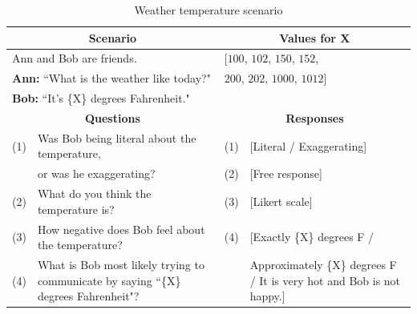 \documentclass{article} %
\begin{document}
\begin{table}[h]
\begin{tabular}{| p{0.15cm}  p{8.15cm}| p{0.15cm}p{4cm} |}\hline
\multicolumn{2}{|c|}{\textbf{Scenario}} & \multicolumn{2}{c|}{\textbf{Values for X}} \\\hline
\multicolumn{2}{|l|}{Ann and Bob are friends.} & \multicolumn{2}{l|}{[$100$, $102$, $150$, $152$,}\\
\multicolumn{2}{|l|}{\textbf{Ann:} ``What is the weather like today?"} & \multicolumn{2}{l|}{$200$, $202$, $1000$, $1012$]}\\
\multicolumn{2}{|l|}{\textbf{Bob:} ``It's \{X\} degrees Fahrenheit."} & \multicolumn{2}{l|}{}\\\hline
\multicolumn{2}{|c|}{\textbf{Questions}} & \multicolumn{2}{c|}{\textbf{Responses}} \\\hline
(1) & Was Bob being literal about the temperature, & (1) &[Literal / Exaggerating] \\
 & or was he exaggerating? & (2) & [Free response] \\
(2) & What do you think the temperature is? & (3) & [Likert scale] \\
(3) & How negative does Bob feel about the temperature? & (4) & [Exactly \{X\} degrees F / \\
(4) & What is Bob most likely trying to communicate by saying  ``\{X\} degrees Fahrenheit"? & & Approximately \{X\} degrees F / It is very hot and Bob is not happy.]\\\hline
\end{tabular}
\caption{Weather temperature scenario}
\label{tab:weathertable}
\end{table}

\clearpage
\end{document}
